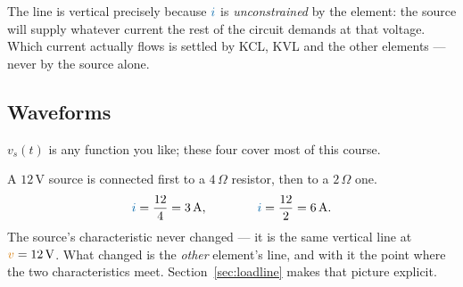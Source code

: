 \documentclass[11pt,a4paper]{article}
\newcommand{\Icol}[1]{\textcolor{ccur}{#1}}
\newcommand{\Vcol}[1]{\textcolor{cvolt}{#1}}
\newcommand{\uni}[1]{\,\mathrm{#1}}
\newcommand{\A}{\uni{A}}   \newcommand{\V}{\uni{V}}
\newcommand{\ohm}{\,\Omega}
\begin{document}
\begin{cautionbox}
The line is vertical precisely because $\Icol{i}$ is \emph{unconstrained} by the element:
the source will supply whatever current the rest of the circuit demands at that voltage.
Which current actually flows is settled by KCL, KVL and the other elements --- never by
the source alone.
\end{cautionbox}

\subsection{Waveforms}

$v_s(t)$ is any function you like; these four cover most of this course.

\begin{center}
\end{center}
\vspace{4pt}

\begin{examplebox}
A $12\V$ source is connected first to a $4\ohm$ resistor, then to a $2\ohm$ one.
\[
  \Icol{i} = \frac{12}{4} = 3\A , \qquad\qquad \Icol{i} = \frac{12}{2} = 6\A .
\]
The source's characteristic never changed --- it is the same vertical line at
$\Vcol{v} = 12\V$. What changed is the \emph{other} element's line, and with it the point
where the two characteristics meet. Section~\ref{sec:loadline} makes that picture explicit.
\end{examplebox}
\end{document}
